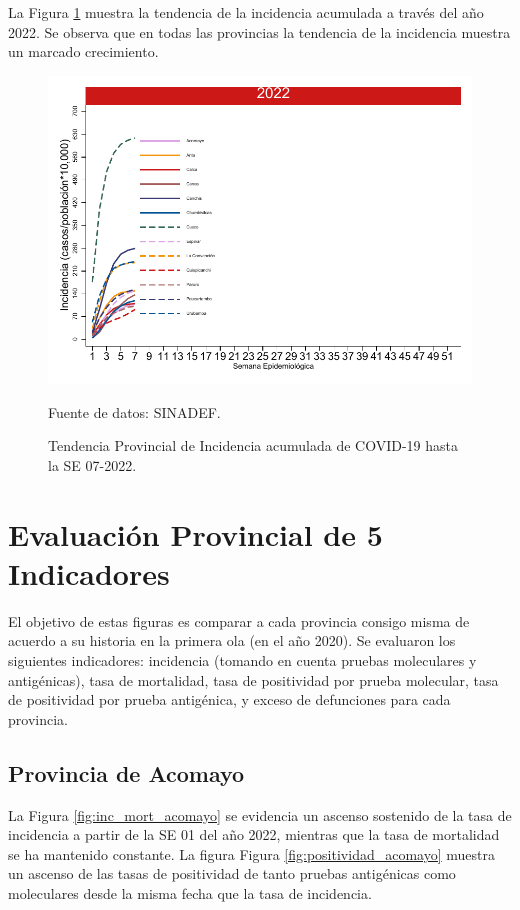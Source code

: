 \documentclass[12pt,a4paper,openany]{book}
\begin{document}
La Figura \ref{fig:incidencia_provincial} muestra la tendencia de la incidencia acumulada a través del año 2022. Se observa que en todas las provincias la tendencia de la incidencia muestra un marcado crecimiento. 
%
\begin{figure}[h]
	\caption{Tendencia Provincial de Incidencia acumulada de COVID-19 hasta la SE 07-2022. }\label{fig:incidencia_provincial}
	\begin{center}
		\includegraphics[width=0.65\linewidth]{../figuras/incidencia_provincial_2022.pdf}
	\end{center}
	{\footnotesize {Fuente de datos: SINADEF.}}
\end{figure}

\clearpage
	
\section*{Evaluación Provincial de 5 Indicadores}
		\noindent El objetivo de estas figuras es comparar a cada provincia consigo misma de acuerdo a su historia  en la primera ola (en el año 2020). Se evaluaron los siguientes indicadores: incidencia (tomando en cuenta pruebas moleculares y antigénicas), tasa de mortalidad, tasa de positividad por prueba molecular, tasa de positividad por prueba antigénica, y exceso de defunciones para cada provincia.
		
		\subsection*{Provincia de Acomayo}
		\noindent La Figura \ref{fig:inc_mort_acomayo} se evidencia un ascenso sostenido de la tasa de incidencia a partir de la SE 01 del año 2022, mientras que la tasa de mortalidad se ha mantenido constante. 
		\noindent La figura Figura \ref{fig:positividad_acomayo} muestra un ascenso de las tasas de positividad de tanto pruebas antigénicas como moleculares desde la misma fecha que la tasa de incidencia. 
		
\end{document}
